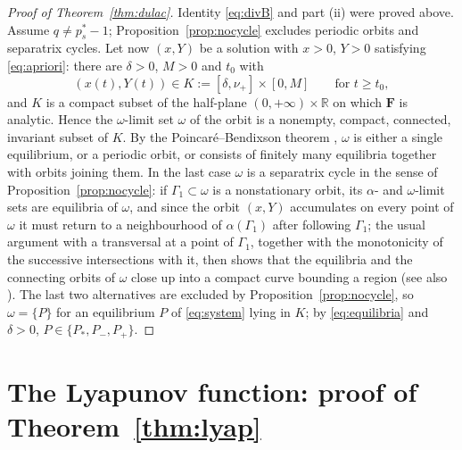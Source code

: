 \documentclass[11pt,reqno]{amsart}
\numberwithin{equation}{section}
\theoremstyle{plain}
\theoremstyle{definition}
\newcommand{\R}{\mathbb{R}}
\begin{document}
\begin{proof}[Proof of Theorem~\ref{thm:dulac}]
Identity \eqref{eq:divB} and part (ii) were proved above. Assume
$q\ne p^{*}_{s}-1$; Proposition~\ref{prop:nocycle} excludes periodic orbits and
separatrix cycles. Let now $(x,Y)$ be a solution with $x>0$, $Y>0$ satisfying
\eqref{eq:apriori}: there are $\delta>0$, $M>0$ and $t_{0}$ with
\[
(x(t),Y(t))\in K:=[\delta,\nu_{+}]\times[0,M]\qquad\text{for }t\ge t_{0},
\]
and $K$ is a compact subset of the half-plane $(0,+\infty)\times\R$ on which
$\mathbf F$ is analytic. Hence the $\omega$-limit set $\omega$ of the orbit is a
nonempty, compact, connected, invariant subset of $K$. By the
Poincar\'e--Bendixson theorem \cite[\S1.7]{DLA}, $\omega$ is either a single
equilibrium, or a
periodic orbit, or consists of finitely many equilibria together with orbits
joining them. In the last case $\omega$ is a separatrix cycle in the sense of
Proposition~\ref{prop:nocycle}: if $\Gamma_{1}\subset\omega$ is a nonstationary
orbit, its $\alpha$- and $\omega$-limit sets are equilibria of $\omega$, and
since the orbit $(x,Y)$ accumulates on every point of $\omega$ it must return
to a neighbourhood of $\alpha(\Gamma_{1})$ after following $\Gamma_{1}$; the
usual argument with a transversal at a point of $\Gamma_{1}$, together with the
monotonicity of the successive intersections with it, then shows that the
equilibria and the connecting orbits of $\omega$ close up into a compact curve
bounding a region (see also \cite[\S1.7]{DLA}). The last two alternatives are
excluded by Proposition~\ref{prop:nocycle}, so $\omega=\{P\}$ for an equilibrium $P$ of
\eqref{eq:system} lying in $K$; by \eqref{eq:equilibria} and $\delta>0$,
$P\in\{P_{*},P_{-},P_{+}\}$.
\end{proof}



\section{The Lyapunov function: proof of Theorem~\ref{thm:lyap}}\label{sec:lyap}
\end{document}
